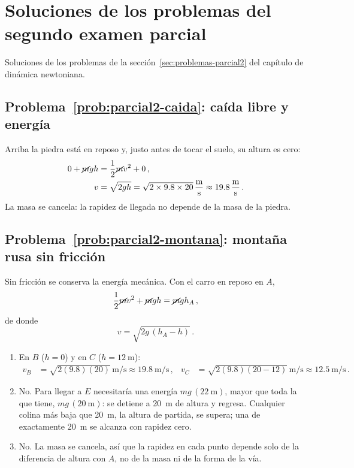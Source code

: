 \documentclass[11pt,a4paper]{book}
\begin{document}
    

\section{Soluciones de los problemas del segundo examen parcial}
\label{sec:soluciones-parcial2}

Soluciones de los problemas de la
sección~\ref{sec:problemas-parcial2} del capítulo de dinámica newtoniana.

\subsection*{Problema~\ref{prob:parcial2-caida}: caída libre y energía}
\label{sol:parcial2-caida}

Arriba la piedra está en reposo y, justo antes de tocar el suelo, su altura
es cero:
\begin{align}
    0 + \cancel{m}gh &= \frac{1}{2}\cancel{m}v^2 + 0\,, \nonumber\\
    v &= \sqrt{2gh} = \sqrt{2 \times 9.8 \times 20}\,\si{\meter\per\second}
      \approx \SI{19.8}{\meter\per\second}\,.
\end{align}
La masa se cancela: la rapidez de llegada no depende de la masa de la
piedra.

\subsection*{Problema~\ref{prob:parcial2-montana}: montaña rusa sin fricción}
\label{sol:parcial2-montana}

Sin fricción se conserva la energía mecánica. Con el carro en reposo en $A$,
\begin{equation*}
    \frac{1}{2}\cancel{m}v^2 + \cancel{m}gh = \cancel{m}gh_A\,,
\end{equation*}
de donde
\begin{equation}
    v = \sqrt{2g\,(h_A - h)}\,.
\end{equation}
\begin{enumerate}[label=\alph*)]
    \item En $B$ ($h = 0$) y en $C$ ($h = \SI{12}{\meter}$):
    \begin{align}
        v_B &= \sqrt{2(9.8)(20)}\,\si{\meter\per\second}
            \approx \SI{19.8}{\meter\per\second}\,, &
        v_C &= \sqrt{2(9.8)(20 - 12)}\,\si{\meter\per\second}
            \approx \SI{12.5}{\meter\per\second}\,.
    \end{align}
    \item No. Para llegar a $E$ necesitaría una energía
    $mg\,(\SI{22}{\meter})$, mayor que toda la que tiene,
    $mg\,(\SI{20}{\meter})$: se detiene a \SI{20}{\meter} de altura y
    regresa. Cualquier colina más baja que \SI{20}{\meter}, la altura de
    partida, se supera; una de exactamente \SI{20}{\meter} se alcanza con
    rapidez cero.
    \item No. La masa se cancela, así que la rapidez en cada punto depende
    solo de la diferencia de altura con $A$, no de la masa ni de la forma de
    la vía.
\end{enumerate}
\end{document}
